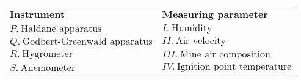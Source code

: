 \begin{tabular}{ll}
\textbf{Instrument} & \textbf{Measuring parameter} \\
$P.~\text{Haldane apparatus}$ & $I.~\text{Humidity}$ \\
$Q.~\text{Godbert-Greenwald apparatus}$ & $II.~\text{Air velocity}$ \\
$R.~\text{Hygrometer}$ & $III.~\text{Mine air composition}$ \\
$S.~\text{Anemometer}$ & $IV.~\text{Ignition point temperature}$ \\
\end{tabular}